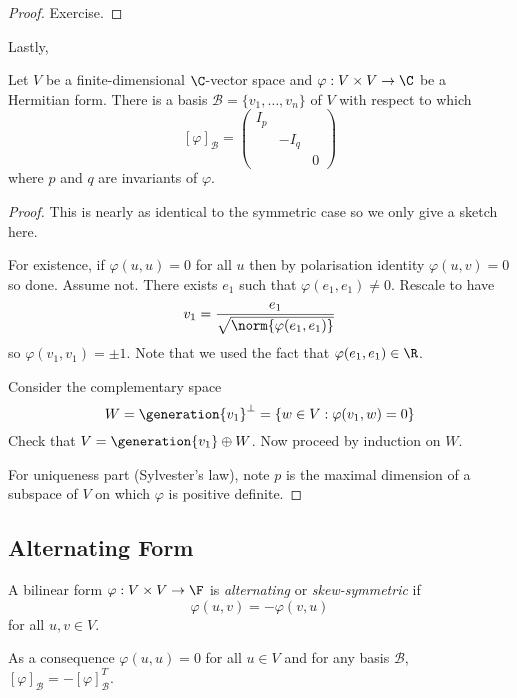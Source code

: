 \documentclass[a4paper]{article}
\newcommand*{\spans}{\generation}
\newcommand*{\basis}{\mathcal}
\theoremstyle{definition}
\begin{document}
\begin{proof}
  Exercise.
\end{proof}

Lastly,
\begin{theorem}
  Let \(V\) be a finite-dimensional \(\C\)-vector space and \(\varphi: V \times V \to \C\) be a Hermitian form. There is a basis \(\basis B = \{v_1, \dots, v_n\}\) of \(V\) with respect to which
  \[
    [\varphi]_{\basis B} =
    \begin{pmatrix}
      I_p & & \\
      & -I_q & \\
      & & 0
    \end{pmatrix}
  \]
  where \(p\) and \(q\) are invariants of \(\varphi\).
\end{theorem}

\begin{proof}
  This is nearly as identical to the symmetric case so we only give a sketch here.

  For existence, if \(\varphi(u, u) = 0\) for all \(u\) then by polarisation identity \(\varphi(u, v) = 0\) so done. Assume not. There exists \(e_1\) such that \(\varphi(e_1, e_1) \neq 0\). Rescale to have
  \[
    v_1 = \frac{e_1}{\sqrt{\norm{\varphi(e_1, e_1)}}}
  \]
  so \(\varphi(v_1, v_1) = \pm 1\). Note that we used the fact that \(\varphi(e_1, e_1) \in \R\).

  Consider the complementary space
  \[
    W = \spans{v_1}^\perp = \left\{ w \in V: \varphi(v_1, w) = 0 \right\}
  \]
  Check that \(V = \spans{v_1} \oplus W\). Now proceed by induction on \(W\).

  For uniqueness part (Sylvester's law), note \(p\) is the maximal dimension of a subspace of \(V\) on which \(\varphi\) is positive definite.
\end{proof}

\subsection{Alternating Form}

\begin{definition}
  A bilinear form \(\varphi: V \times V \to \F\) is \emph{alternating} or \emph{skew-symmetric} if
  \[
    \varphi(u, v) = - \varphi(v, u)
  \]
  for all \(u, v \in V\).
\end{definition}

As a consequence \(\varphi(u, u) = 0\) for all \(u \in V\) and for any basis \(\basis B\), \([\varphi]_{\basis B} = - [\varphi]_{\basis B}^T\).
\end{document}
